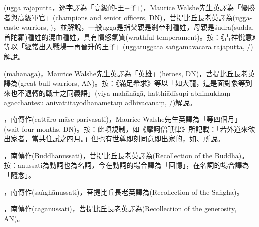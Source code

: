 \startitemgroup[noteitems]
\item{}(uggā rājaputtā，逐字譯為「高級的-王+子」)，Maurice Walshe先生英譯為「優勝者與高級軍官」(champions and senior officers, DN)，菩提比丘長老英譯為(ugga-caste warriors, )，並解說，一般ugga是指父親是剎帝利種姓，母親是śudra(sudda,首陀羅)種姓的混血種姓，具有憤怒氣質(wrathful temperament)。按：《吉祥悅意》等以「經常出入戰場一再晉升的王子」(uggatuggatā saṅgāmāvacarā rājaputtā, /)解說。
\stopitemgroup

\startitemgroup[noteitems]
\item{}(mahānāgā)，Maurice Walshe先生英譯為「英雄」(heroes, DN)，菩提比丘長老英譯為(great-bull warriors, AN)。按：《滿足希求》等以「如大龍，這是面對象等到來也不退轉的戰士之同義語」(viya mahānāgā, hatthiādīsupi abhimukhaṃ āgacchantesu anivattitayodhānametaṃ adhivacanaṃ, /)解說。
\stopitemgroup

\startitemgroup[noteitems]
\item{}，南傳作(cattāro māse parivasati)，Maurice Walshe先生英譯為「等四個月」(wait four months, DN)。按：此項規制，如《摩訶僧祇律》所記載：「若外道來欲出家者，當共住試之四月。」但也有世尊即刻同意即出家的，如、所說。
\stopitemgroup

\startitemgroup[noteitems]
\item{}，南傳作(Buddhānussati)，菩提比丘長老英譯為(Recollection of the Buddha)。按：anussati為動詞也為名詞，今在動詞的場合譯為「回憶」，在名詞的場合譯為「隨念」。
\item{}，南傳作(saṅghānussati)，菩提比丘長老英譯為(Recollection of the Saṅgha)。
\item{}，南傳作(cāgānussati)，菩提比丘長老英譯為(Recollection of the generosity, AN)。
\stopitemgroup

